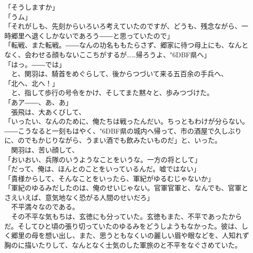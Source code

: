 \documentclass[
  paper=a5,
  fontsize=10pt,
  jafontsize=9.5pt,
  tate,                  %
  open_bracket_pos=nibu, %
]{jlreq}
\begin{document}
「そうしますか」\\


「うム」\\


「それがしも、先刻からいろいろ考えていたのですが、どうも、残念ながら、一時郷里へ退くしかないであろう――と思っていたので」\\


「転戦、また転戦。――なんの功名ももたらさず、郷家に待つ母上にも、なんとなく、会わせる顔もないここちがするが……帰ろうよ、{\char"6DBF}県へ」\\


「はっ。――では」\\


　と、関羽は、騎首をめぐらして、後からつづいて来る五百余の手兵へ、\\


「北へ、北へ！」\\


　と、指して歩行の号令をかけ、そしてまた黙々と、歩みつづけた。\\


「あア――、あ、あ」\\


　張飛は、大あくびして、\\


「いったい、なんのために、俺たちは戦ったんだい。ちっともわけが分らない。――こうなると一刻もはやく、{\char"6DBF}県の城内へ帰って、市の酒屋で久しぶりに、のでもかじりながら、うまい酒でも飲みたいものだ」と、いった。\\


　関羽は、苦い顔して、\\


「おいおい、兵隊のいうようなことをいうな。一方の将として」\\


「だって、俺は、ほんとのことをいっているんだ。嘘ではない」\\


「貴様からして、そんなことをいったら、軍紀がゆるむじゃないか」\\


「軍紀のゆるみだしたのは、俺のせいじゃない。官軍官軍と、なんでも、官軍とさえいえば、意気地なく恐がる人間のせいだろ」\\


　不平満々なのである。\\


　その不平な気もちは、玄徳にも分っていた。玄徳もまた、不平であったからだ。そしてひと頃の張り切っていたのゆるみをどうしようもなかった。彼は、しく郷里の母を想い出し、また、思うともなくいの麗しい眉や眼などを、人知れず胸のに描いたりして、なんとなく士気のした軍旅のと不平をなぐさめていた。\\
\end{document}
